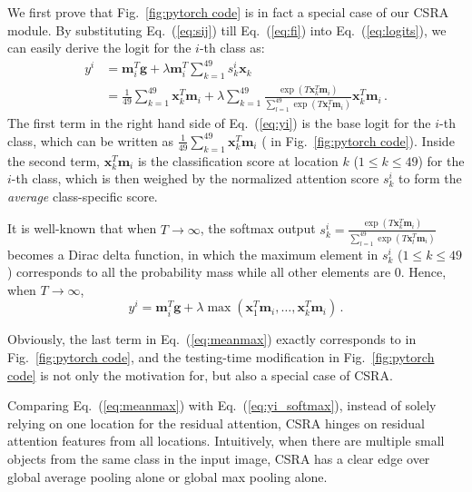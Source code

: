 \documentclass[10pt,twocolumn,letterpaper]{article}
\begin{document}
We first prove that Fig.~\ref{fig:pytorch code} is in fact a special case of our CSRA module. By substituting Eq.~(\ref{eq:sij}) till Eq.~(\ref{eq:fi}) into Eq.~(\ref{eq:logits}), we can easily derive the logit for the $i$-th class as:
\begin{align} 
	y^i & = \mathbf{m}_i^T \mathbf{g} + \lambda \mathbf{m}_i^T \sum_{k=1}^{49} s_k^i \mathbf{x}_k 	\label{eq:yi} \\
		& = \frac{1}{49} \sum_{k=1}^{49} \mathbf{x}_k^T\mathbf{m}_i + \lambda \sum_{k=1}^{49}
		\frac{\exp (T \mathbf{x}_k^T \mathbf{m}_i)}{ \sum_{l=1}^{49} \exp(T\mathbf{x}_l^T\mathbf{m}_i)} \mathbf{x}_k^T \mathbf{m}_i \,. \label{eq:yi_softmax}
\end{align}
The first term in the right hand side of Eq.~(\ref{eq:yi}) is the base logit for the $i$-th class, which can be written as $\frac{1}{49}\sum_{k=1}^{49} \mathbf{x}_k^T \mathbf{m}_i$ ( in Fig.~\ref{fig:pytorch code}). Inside the second term, $\mathbf{x}_k^T\mathbf{m}_i$ is the classification score at location $k$ ($1 \le k \le 49$) for the $i$-th class, which is then weighed by the normalized attention score $s_k^i$ to form the \emph{average} class-specific score.

It is well-known that when $T\rightarrow \infty$, the softmax output $s_k^i = \frac{\exp (T \mathbf{x}_k^T \mathbf{m}_i)}{ \sum_{l=1}^{49} \exp(T\mathbf{x}_l^T\mathbf{m}_i)}$ becomes a Dirac delta function, in which the maximum element in $s_k^i$ ($1 \le k \le 49$) corresponds to all the probability mass while all other elements are 0. Hence, when $T\rightarrow \infty$,
\begin{equation} 
	\label{eq:meanmax}
	y^i  = \mathbf{m}_i^T \mathbf{g} + \lambda \max (\mathbf{x}_1^T\mathbf{m}_i,\dots,\mathbf{x}_k^T\mathbf{m}_i) \,.
\end{equation}

Obviously, the last term in Eq.~(\ref{eq:meanmax}) exactly corresponds to  in Fig.~\ref{fig:pytorch code}, and the testing-time modification in Fig.~\ref{fig:pytorch code} is not only the motivation for, but also a special case of CSRA.

Comparing Eq.~(\ref{eq:meanmax}) with Eq.~(\ref{eq:yi_softmax}), instead of solely relying on one location for the residual attention, CSRA hinges on residual attention features from all locations. Intuitively, when there are multiple small objects from the same class in the input image, CSRA has a clear edge over global average pooling alone or global max pooling alone.
\end{document}
